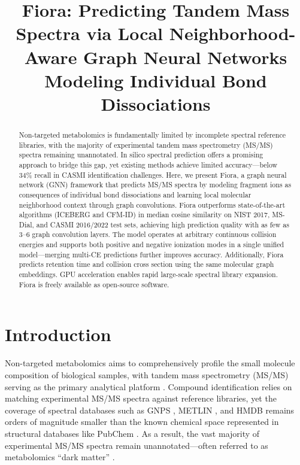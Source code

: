 \documentclass[11pt]{article}
\title{Fiora: Predicting Tandem Mass Spectra via Local Neighborhood-Aware Graph Neural Networks Modeling Individual Bond Dissociations}
\author{%
}
\date{}
\begin{document}
\maketitle

\begin{abstract}
Non-targeted metabolomics is fundamentally limited by incomplete spectral reference libraries, with the majority of experimental tandem mass spectrometry (MS/MS) spectra remaining unannotated. In silico spectral prediction offers a promising approach to bridge this gap, yet existing methods achieve limited accuracy---below 34\% recall in CASMI identification challenges. Here, we present Fiora, a graph neural network (GNN) framework that predicts MS/MS spectra by modeling fragment ions as consequences of individual bond dissociations and learning local molecular neighborhood context through graph convolutions. Fiora outperforms state-of-the-art algorithms (ICEBERG and CFM-ID) in median cosine similarity on NIST 2017, MS-Dial, and CASMI 2016/2022 test sets, achieving high prediction quality with as few as 3--6 graph convolution layers. The model operates at arbitrary continuous collision energies and supports both positive and negative ionization modes in a single unified model---merging multi-CE predictions further improves accuracy. Additionally, Fiora predicts retention time and collision cross section using the same molecular graph embeddings. GPU acceleration enables rapid large-scale spectral library expansion. Fiora is freely available as open-source software.
\end{abstract}

\section{Introduction}

Non-targeted metabolomics aims to comprehensively profile the small molecule composition of biological samples, with tandem mass spectrometry (MS/MS) serving as the primary analytical platform \citep{Wishart2018,Kind2018}. Compound identification relies on matching experimental MS/MS spectra against reference libraries, yet the coverage of spectral databases such as GNPS \citep{Wang2016}, METLIN \citep{Guijas2018}, and HMDB \citep{Wishart2022} remains orders of magnitude smaller than the known chemical space represented in structural databases like PubChem \citep{Kim2023}. As a result, the vast majority of experimental MS/MS spectra remain unannotated---often referred to as metabolomics ``dark matter'' \citep{daSliva2015,Schymanski2017}.
\end{document}
